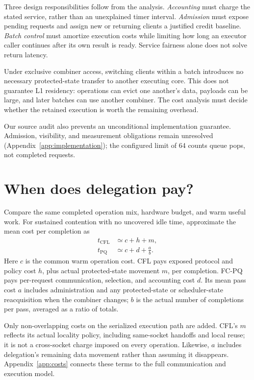 \documentclass[10pt,twocolumn]{article}
\begin{document}
Three design responsibilities follow from the analysis. \emph{Accounting}
must charge the stated service, rather than an unexplained timer interval.
\emph{Admission} must expose pending requests and assign new or returning
clients a justified credit baseline. \emph{Batch control} must amortize
execution costs while limiting how long an executor caller continues after
its own result is ready. Service fairness alone does not solve return latency.

Under exclusive combiner access, switching clients within a batch introduces
no necessary protected-state transfer to another executing core. This does
not guarantee L1 residency: operations can evict one another's data, payloads
can be large, and later batches can use another combiner. The cost analysis
must decide whether the retained execution is worth the remaining overhead.

Our source audit also prevents an unconditional implementation guarantee.
Admission, visibility, and measurement obligations remain unresolved
(Appendix~\ref{app:implementation}); the configured limit of 64 counts queue
pops, not completed requests.

\section{When does delegation pay?}
\label{sec:storycost}
Compare the same completed operation mix, hardware budget, and warm useful
work. For sustained contention with no uncovered idle time, approximate the
mean cost per completion as
\begin{equation}
\begin{aligned}
 t_{\mathrm{CFL}} &\simeq c+h+m,\\
 t_{\mathrm{PQ}} &\simeq c+d+\frac{a}{b}.
\end{aligned}
\label{eq:storycosts}
\end{equation}
Here $c$ is the common warm operation cost. CFL pays exposed protocol and
policy cost $h$, plus actual protected-state movement $m$, per completion.
FC-PQ pays per-request communication, selection, and accounting cost $d$.
Its mean pass cost $a$ includes administration and any protected-state or
scheduler-state reacquisition when the combiner changes; $b$ is the actual
number of completions per pass, averaged as a ratio of totals.

Only non-overlapping costs on the serialized execution path are added.
CFL's $m$ reflects its actual locality policy, including same-socket handoffs
and local reuse; it is not a cross-socket charge imposed on every operation.
Likewise, $a$ includes delegation's remaining data movement rather than
assuming it disappears. Appendix~\ref{app:costs} connects these terms to the
full communication and execution model.
\end{document}
